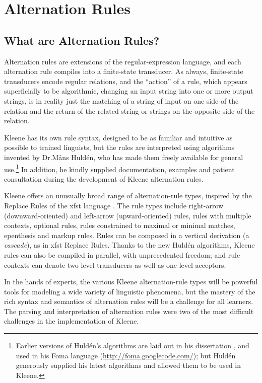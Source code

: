 \chapter{Alternation Rules}

\label{chapt:alternationrules}

\section{What are Alternation Rules?}

Alternation rules are extensions of the regular-expression language, and each alternation rule compiles into a
finite-state transducer.  As always, finite-state transducers encode regular relations, and the ``action'' of a rule,
which appears superficially to be algorithmic, changing an input string into one or more output strings, is in
reality just the matching of a string of input on one side of the relation
and the return of the related string or strings on the
opposite side of the relation.

Kleene has its own rule syntax, designed to be as familiar and intuitive as possible to trained linguists, but the
rules are interpreted using algorithms invented by Dr.\@ M\r{a}ns Huldén, who has made them freely available for
general use.\footnote{Earlier versions of Huldén's algorithms are laid
out in his dissertation \citep{hulden:2009thesis}, and
used in his Foma language (\url{http://foma.googlecode.com/});
but Huldén generously supplied his latest algorithms and
allowed them to be used in Kleene.}  In addition, he kindly supplied
documentation, examples and patient consultation
during the development of Kleene alternation rules.  

Kleene offers an unusually broad range of alternation-rule types, inspired by the Replace Rules of the xfst
language \citep{beesley+karttunen:2003}.  The rule types include right-arrow (downward-oriented) and
left-arrow (upward-oriented) rules, rules with multiple contexts, optional rules, rules constrained
to maximal or minimal matches, epenthesis and markup rules.   Rules can be composed in a vertical
derivation (a \emph{cascade}), as in xfst Replace Rules.  Thanks to the
new Huldén algorithms, Kleene rules can
also be compiled in parallel, with unprecedented freedom; and rule contexts can denote two-level
transducers as well as one-level acceptors.

In the hands of experts, the various Kleene alternation-rule types will be powerful tools for
modeling a wide variety of linguistic phenomena, but the mastery of the rich syntax and semantics of
alternation rules will be a challenge for all learners.  The
	parsing and interpretation of alternation rules were two of the most
difficult challenges in the implementation of Kleene.

